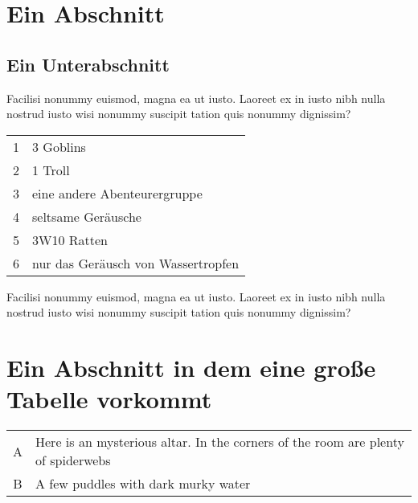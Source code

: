 \documentclass[11pt]{wbzine}
\begin{document}
\begin{multicols}{2}

\section{Ein Abschnitt}

\lipsum

\subsection{Ein Unterabschnitt}


\lipsum

\begin{tcolorbox}
Facilisi nonummy euismod, magna ea ut iusto. Laoreet ex in iusto nibh nulla nostrud iusto wisi nonummy suscipit tation quis nonummy dignissim?
\end{tcolorbox}

\lipsum

\begin{tabularx}{\columnwidth}{cZ}
1 & 3 Goblins \\
2 & 1 Troll \\
3 & eine andere Abenteurergruppe \\
4 & seltsame Geräusche \\
5 & 3W10 Ratten \\
6 & nur das Geräusch von Wassertropfen \\
\end{tabularx}


\lipsum

\begin{tcolorbox}
Facilisi nonummy euismod, magna ea ut iusto. Laoreet ex in iusto nibh nulla nostrud iusto wisi nonummy suscipit tation quis nonummy dignissim?
\end{tcolorbox}

\section{Ein Abschnitt in dem eine große Tabelle vorkommt}

\lipsum

\end{multicols}
\begin{tabularx}{\textwidth}{cZ}
A & Here is an mysterious altar. In the corners of the room are
plenty of spiderwebs \\
B & A few puddles with dark murky water \\
\end{tabularx}
\begin{multicols}{2}

\lipsum


\lipsum


\end{multicols}
\end{document}
